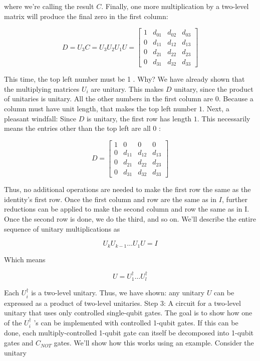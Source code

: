 \documentclass[main.tex]{subfiles}
\begin{document}
    where we're calling the result $C$. Finally, one more multiplication by a two-level matrix will produce the final zero in the first column:
    
    $$
    D=U_{3} C=U_{3} U_{2} U_{1} U=\left[\begin{array}{llll}
    1 & d_{01} & d_{02} & d_{03} \\
    0 & d_{11} & d_{12} & d_{13} \\
    0 & d_{21} & d_{22} & d_{23} \\
    0 & d_{31} & d_{32} & d_{33}
    \end{array}\right]
    $$
    
    This time, the top left number must be 1 . Why? We have already shown that the multiplying matrices $U_{i}$ are unitary. This makes $D$ unitary, since the product of unitaries is unitary. All the other numbers in the first column are 0. Because a column must have unit length, that makes the top left number $1$. Next, a pleasant windfall: Since $D$ is unitary, the first row has length $1$. This necessarily means the entries other than the top left are all 0 :
    
    $$
    D=\left[\begin{array}{cccc}
    1 & 0 & 0 & 0 \\
    0 & d_{11} & d_{12} & d_{13} \\
    0 & d_{21} & d_{22} & d_{23} \\
    0 & d_{31} & d_{32} & d_{33}
    \end{array}\right]
    $$
    
    Thus, no additional operations are needed to make the first row the same as the identity's first row. Once the first column and row are the same as in $I$, further reductions can be applied to make the second column and row the same as in I. Once the second row is done, we do the third, and so on. We'll describe the entire sequence of unitary multiplications as
    
    $$
    U_{k} U_{k-1} \ldots U_{1} U=I
    $$
    
    Which means
    
    $$
    U=U_{1}^{\dagger} \ldots U_{l}^{\dagger}
    $$
    
    Each $U_{i}^{\dagger}$ is a two-level unitary. Thus, we have shown: any unitary $U$ can be expressed as a product of two-level unitaries. Step 3: A circuit for a two-level unitary that uses only controlled single-qubit gates. The goal is to show how one of the $U_{i}^{\dagger}$ 's can be implemented with controlled 1-qubit gates. If this can be done, each multiply-controlled 1-qubit gate can itself be decomposed into 1-qubit gates and $C_{N O T}$ gates. We'll show how this works using an example. Consider the unitary
    
\end{document}
